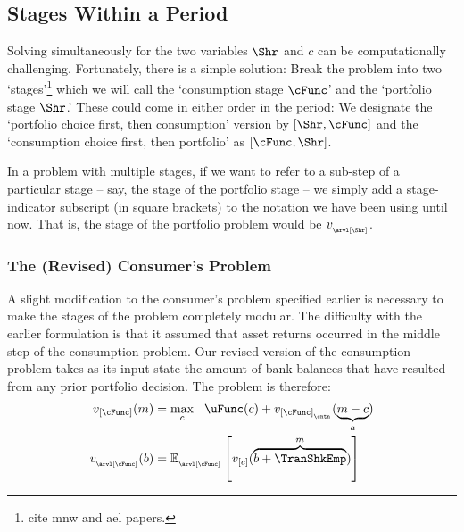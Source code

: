 \documentclass[titlepage, headings=optiontotocandhead]{Resources/texmf-local/tex/latex/econtex}
\begin{document}
\hypertarget{stages-within-a-period}{}
\subsection{{Stage}s Within a {Period}}\label{subsec:stageswithin}

Solving simultaneously for the two variables $\Shr$ and $c$ can be computationally challenging.  Fortunately, there is a simple solution: Break the problem into two `{stage}s'\footnote{cite mnw and ael papers.} 
which we will call the `consumption {stage} $\cFunc$' and the `portfolio {stage} $\Shr$.'  These could come in either order in the {period}: We designate the `portfolio choice first, then consumption' version by $[\Shr,\cFunc]$ and the `consumption choice first, then portfolio' as $[\cFunc,\Shr]$.

In a problem with multiple {stages}, if we want to refer to a sub-{step} of a particular {stage} -- say, the {\Arrival} {stage} of the portfolio {stage} -- we simply add a {stage}-indicator subscript (in square brackets) to the notation we have been using until now.  That is, the {\Arrival} {stage} of the portfolio problem would be $v_{_\arvl[\Shr]}$.

\hypertarget{revised-consumers-problem}{}
\subsubsection{The (Revised) Consumer's Problem}\label{subsubsec:revised-consumers-problem}

A slight modification to the consumer's problem specified earlier is necessary to make the {stage}s of the problem completely modular.  The difficulty with the earlier formulation is that it assumed that asset returns occurred in the middle {step} of the consumption problem.  Our revised version of the consumption problem takes as its input state the amount of bank balances that have resulted from any prior portfolio decision.  The problem is therefore:
  \begin{equation}\begin{gathered}\begin{aligned}
 v_{[\cFunc]}(m) & =  \max_{c} ~~ \uFunc(c)+  v_{[\cFunc]_{_\cntn}}(\underbrace{m-c}_{a})             
\\    v_{_\arvl[\cFunc]}(b) & = \Ex_{_\arvl[\cFunc]}\left[v_{[c]}(\overbrace{b+\TranShkEmp}^{m})\right] \label{eq:vBalances}
      \end{aligned}\end{gathered}\end{equation}
\end{document}
